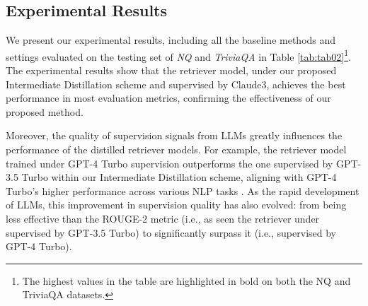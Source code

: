 \subsection{Experimental Results}
We present our experimental results, including all the baseline methods and settings evaluated on the testing set of \textit{NQ} and \textit{TriviaQA} in Table \ref{tab:tab02}\footnote{The highest values in the table are highlighted in bold on both the NQ and TriviaQA datasets.}.
The experimental results show that the retriever model, under our proposed Intermediate Distillation scheme and supervised by Claude3, achieves the best performance in most evaluation metrics, confirming the effectiveness of our proposed method.

Moreover, the quality of supervision signals from LLMs greatly influences the performance of the distilled retriever models.
For example, the retriever model trained under GPT-4 Turbo supervision outperforms the one supervised by GPT-3.5 Turbo within our Intermediate Distillation scheme, aligning with GPT-4 Turbo’s higher performance across various NLP tasks \cite{openai2023gpt4}. 
As the rapid development of LLMs, this improvement in supervision quality has also evolved: from being less effective than the ROUGE-2 metric (i.e., as seen the retriever under supervised by GPT-3.5 Turbo) to significantly surpass it (i.e., supervised by GPT-4 Turbo).

